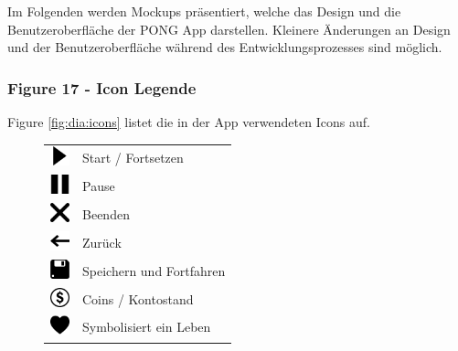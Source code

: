 Im Folgenden werden Mockups präsentiert, welche das Design und die Benutzer\-ober\-fläche der PONG App darstellen. Kleinere Änderungen an Design und der Benutzer\-ober\-fläche während des Entwicklungsprozesses sind möglich.

\subsubsection{Figure 17 - Icon Legende}
Figure \ref{fig:dia:icons} listet die in der App verwendeten Icons auf.
\vspace*{0.5cm}

\begin{figure}[h!]
    \begin{center}
        \begin{tabular}{ll}
            \includegraphics[width=1.5em,height=1.5em]{diagramme/assets/Media-Play-256.png} & Start / Fortsetzen \\
            \includegraphics[width=1.5em,height=1.5em]{diagramme/assets/Media-Pause-256.png} & Pause \\
            \includegraphics[width=1.5em,height=1.5em]{diagramme/assets/Close-256.png} & Beenden\\
            \includegraphics[width=1.5em,height=1.5em]{diagramme/assets/Arrow-Left-05-256.png} & Zurück \\
            \includegraphics[width=1.5em,height=1.5em]{diagramme/assets/Floppy-256.png} & Speichern und Fortfahren \\
            \includegraphics[width=1.5em,height=1.5em]{diagramme/assets/Money-Coin-02-WF-256.png} & Coins / Kontostand \\
            \includegraphics[width=1.5em,height=1.5em]{diagramme/assets/Heart-256.png} & Symbolisiert ein Leben \\

\end{tabular}
\end{center}
\end{figure}
